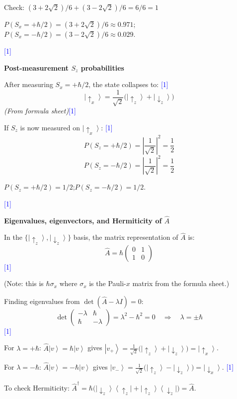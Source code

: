 \documentclass[12pt,a4paper]{article}
\newcommand{\markstep}[1]{\hfill\textcolor{blue}{[#1]}}
\newcommand{\finalanswer}[1]{%
  \begin{tcolorbox}[colback=green!5!white,colframe=green!50!black,boxrule=0.5pt]
  #1
  \end{tcolorbox}
}
\newcommand{\fromsheet}{\textit{(From formula sheet)}}
\renewcommand{\ket}[1]{\left|#1\right\rangle}
\renewcommand{\ketbra}[2]{\left|#1\right\rangle\!\left\langle #2\right|}
\begin{document}
\begin{parts}
Check: $(3+2\sqrt{2})/6 + (3-2\sqrt{2})/6 = 6/6 = 1$ \checkmark

\finalanswer{$P(S_x = +\hbar/2) = (3+2\sqrt{2})/6 \approx 0.971$;\quad $P(S_x = -\hbar/2) = (3-2\sqrt{2})/6 \approx 0.029$.}
\markstep{1}

\item \textbf{Post-measurement $S_z$ probabilities} 

After measuring $S_x = +\hbar/2$, the state collapses to: \markstep{1}
\[
\ket{\!\uparrow_x} = \frac{1}{\sqrt{2}}\bigl(\ket{\!\uparrow_z} + \ket{\!\downarrow_z}\bigr)
\]
\fromsheet \markstep{1}

If $S_z$ is now measured on $\ket{\!\uparrow_x}$: \markstep{1}
\[
P(S_z = +\hbar/2) = \left|\frac{1}{\sqrt{2}}\right|^2 = \frac{1}{2}
\]
\[
P(S_z = -\hbar/2) = \left|\frac{1}{\sqrt{2}}\right|^2 = \frac{1}{2}
\]

\finalanswer{$P(S_z = +\hbar/2) = 1/2$;\quad $P(S_z = -\hbar/2) = 1/2$.}
\markstep{1}

\item \textbf{Eigenvalues, eigenvectors, and Hermiticity of $\hat{A}$} 

In the $\{\ket{\!\uparrow_z}, \ket{\!\downarrow_z}\}$ basis, the matrix representation of $\hat{A}$ is:
\[
\hat{A} = \hbar\begin{pmatrix} 0 & 1 \\ 1 & 0 \end{pmatrix}
\]
\markstep{1}

(Note: this is $\hbar\sigma_x$ where $\sigma_x$ is the Pauli-$x$ matrix from the formula sheet.)

Finding eigenvalues from $\det(\hat{A} - \lambda I) = 0$:
\[
\det\begin{pmatrix} -\lambda & \hbar \\ \hbar & -\lambda \end{pmatrix} = \lambda^2 - \hbar^2 = 0 \quad\Rightarrow\quad \lambda = \pm\hbar
\]
\markstep{1}

For $\lambda = +\hbar$: $\hat{A}\ket{v} = \hbar\ket{v}$ gives $\ket{v_+} = \frac{1}{\sqrt{2}}\bigl(\ket{\!\uparrow_z} + \ket{\!\downarrow_z}\bigr) = \ket{\!\uparrow_x}$.

For $\lambda = -\hbar$: $\hat{A}\ket{v} = -\hbar\ket{v}$ gives $\ket{v_-} = \frac{1}{\sqrt{2}}\bigl(\ket{\!\uparrow_z} - \ket{\!\downarrow_z}\bigr) = \ket{\!\downarrow_x}$.
\markstep{1}

To check Hermiticity: $\hat{A}^\dagger = \hbar\bigl(\ketbra{\!\downarrow_z}{\uparrow_z\!} + \ketbra{\!\uparrow_z}{\downarrow_z\!}\bigr) = \hat{A}$.


\end{parts}
\end{document}
